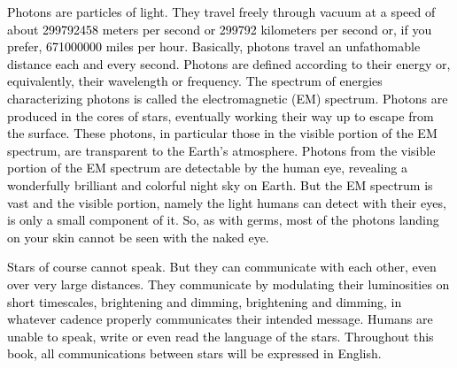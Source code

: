 \documentclass[main.tex]{subfiles}
\begin{document}
\begin{tcolorbox}[sharp corners, colback=blue!30, colframe=blue!80!blue, title=Box \refstepcounter{educhap1}\label{boxchap1:photons}\ref{boxchap1:photons} -- Photons] 
\par \textcolor{black}{Photons are particles of light.  They travel freely through vacuum at a speed of about 299792458 meters per second or 299792 kilometers per second or, if you prefer, 671000000 miles per hour.  Basically, photons travel an unfathomable distance each and every second.  Photons are defined according to their energy or, equivalently, their wavelength or frequency.  The spectrum of energies characterizing photons is called the electromagnetic (EM) spectrum.  Photons are produced in the cores of stars, eventually working their way up to escape from the surface.  These photons, in particular those in the visible portion of the EM spectrum, are transparent to the Earth's atmosphere.  Photons from the visible portion of the EM spectrum are detectable by the human eye, revealing a wonderfully brilliant and colorful night sky on Earth.  But the EM spectrum is vast and the visible portion, namely the light humans can detect with their eyes, is only a small component of it.  So, as with germs, most of the photons landing on your skin cannot be seen with the naked eye.}
\end{tcolorbox}

\begin{tcolorbox}[sharp corners, colback=red!30, colframe=red!80!blue, title=Box \refstepcounter{educhap1}\label{boxchap1:st}\ref{boxchap1:st} -- Stellar Communication]
\par \textcolor{black} {Stars of course cannot speak.  But they can communicate with each other, even over very large distances.  They communicate by modulating their luminosities on short timescales, brightening and dimming, brightening and dimming, in whatever cadence properly communicates their intended message.  Humans are unable to speak, write or even read the language of the stars.  Throughout this book, all communications between stars will be expressed in English.} 
\end{tcolorbox}
\end{document}
